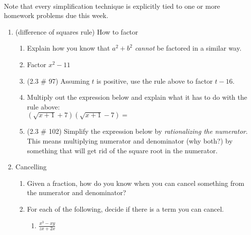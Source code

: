 \documentclass[11pt,fleqn]{article}
\begin{document}
\renewcommand{\headrulewidth}{0pt}
\newcommand{\blank}[1]{\rule{#1}{0.75pt}}
\newcommand{\bc}{\begin{center}}
\newcommand{\ec}{\end{center}}
\renewcommand{\d}{\displaystyle}

\vspace*{-0.7in}

\begin{center}
  \large
  \\
\end{center}
 Note that every simplification technique is explicitly tied to one or more homework problems due this week.\\
\hrulefill

\begin{enumerate}
\item (difference of squares rule) How to factor \scalebox{1.5}{$a^2-b^2=$}
	\begin{enumerate}
	\item Explain how you know that $a^2+b^2$ \emph{cannot} be factored in a similar way.
	\vfill
		
	\item Factor $x^2-11$
	\vfill
	\item (2.3 \# 97) Assuming $t$ is positive, use the rule above to factor $t-16.$
	\vfill
	\item Multiply out the expression below and explain what it has to do with the rule above:\\
	
	$ (\sqrt{x+1} +7)(\sqrt{x+1}-7) = $
	\vfill 
	\item (2.3 \# 102) Simplify the expression below by \emph{rationalizing the numerator}. This means multiplying numerator and denominator (why both?) by something that will get rid of the square root in the numerator.\\
	
	\vspace{2in}
	\end{enumerate}
	\newpage

\item Cancelling
	\begin{enumerate}
	\item Given a fraction, how do you know when you can cancel something from the numerator and denominator?\\
	
	
	\vfill
	\item For each of the following, decide if there is a term you can cancel.
		\begin{enumerate}
		\item $\frac{x^3-xy}{zx+2x}$\\
		\vfill
		

\end{enumerate}
\end{enumerate}
\end{enumerate}
\end{document}
